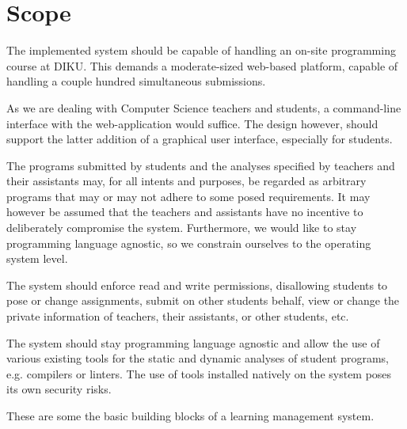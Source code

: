 
\section*{Scope}

The implemented system should be capable of handling an on-site programming
course at DIKU. This demands a moderate-sized web-based platform, capable of
handling a couple hundred simultaneous submissions.

As we are dealing with Computer Science teachers and students, a command-line
interface with the web-application would suffice. The design however, should
support the latter addition of a graphical user interface, especially for
students.

The programs submitted by students and the analyses specified by teachers and
their assistants may, for all intents and purposes, be regarded as arbitrary
programs that may or may not adhere to some posed requirements. It may however
be assumed that the teachers and assistants have no incentive to deliberately
compromise the system. Furthermore, we would like to stay programming language
agnostic, so we constrain ourselves to the operating system level.

The system should enforce read and write permissions, disallowing students to
pose or change assignments, submit on other students behalf, view or change the
private information of teachers, their assistants, or other students, etc.

The system should stay programming language agnostic and allow the use of
various existing tools for the static and dynamic analyses of student programs,
e.g.  compilers or linters. The use of tools installed natively on the system
poses its own security risks.

These are some the basic building blocks of a learning management
system\cite{lms}.

